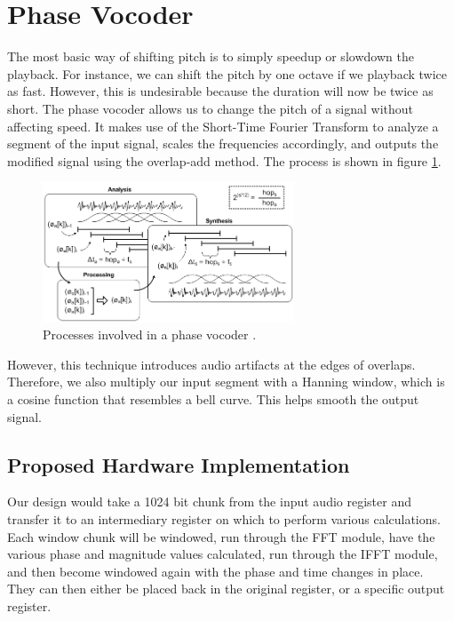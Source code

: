 \documentclass[twoside]{article}
\begin{document}
\section{Phase Vocoder}
  The most basic way of shifting pitch is to simply speedup or slowdown the playback. For instance, we can shift the pitch
  by one octave if we playback twice as fast.  
  However, this is undesirable because the duration will now be twice as short.  
  The phase vocoder allows us to change the pitch of a signal without affecting speed.
  It makes use of the Short-Time Fourier Transform to analyze a segment of the input signal, scales the frequencies accordingly,
  and outputs the modified signal using the overlap-add method. The process is shown in figure \ref{fig:vocoder}.
  \begin{figure}[h]
  \includegraphics[width=75mm]{images/vocoder.png}
  \caption{Processes involved in a phase vocoder \cite{bib:guitarpitchshifter}.}  
  \label{fig:vocoder}
  \end{figure}
  
  However, this technique introduces audio artifacts at the edges of overlaps.  Therefore, we also multiply our input
  segment with a Hanning window, which is a cosine function that resembles a bell curve.  This helps smooth the output
  signal.
  
  \subsection{Proposed Hardware Implementation}
  Our design would take a 1024 bit chunk from the input audio register and transfer it to an intermediary register on which to perform
  various calculations. Each window chunk will be windowed, run through the FFT module, have the various phase and magnitude values
  calculated, run through the IFFT module, and then become windowed again with the phase and time changes in place. They can then either 
  be placed back in the original register, or a specific output register. 
  
%
%
%
%
\end{document}
